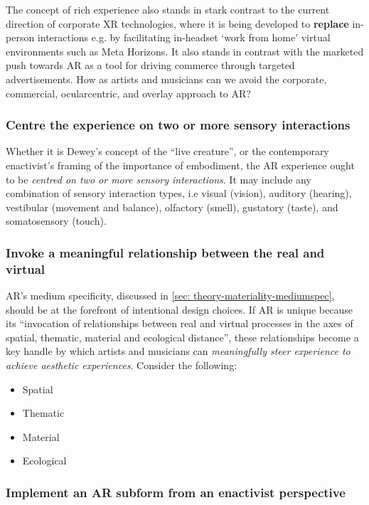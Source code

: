 The concept of rich experience also stands in stark contrast to the current direction of corporate XR technologies, where it is being developed to \textbf{replace} in-person interactions e.g. by facilitating in-headset `work from home' virtual environments such as Meta Horizons. It also stands in contrast with the marketed push towards AR as a tool for driving commerce through targeted advertisements. How as artists and musicians can we avoid the corporate, commercial, ocularcentric, and overlay approach to AR?

\subsubsection{Centre the experience on two or more sensory interactions}
Whether it is Dewey's concept of the ``live creature'', or the contemporary enactivist's framing of the importance of embodiment, the AR experience ought to be \textit{centred on two or more sensory interactions}. It may include any combination of sensory interaction types, i.e visual (vision), auditory (hearing), vestibular (movement and balance), olfactory (smell), gustatory (taste), and somatosensory (touch). %

\subsubsection{Invoke a meaningful relationship between the real and virtual}
AR's medium specificity, discussed in \autoref{sec: theory-materiality-mediumspec}, should be at the forefront of intentional design choices. If AR is unique because its ``invocation of relationships between real and virtual processes in the axes of spatial, thematic, material and ecological distance'', these relationships become a key handle by which artists and musicians can \textit{meaningfully steer experience to achieve aesthetic experiences}. Consider the following:
\begin{itemize}
    \item Spatial \\
    \item Thematic \\
    \item Material \\
    \item Ecological \\
\end{itemize}

\subsubsection{Implement an AR subform from an enactivist perspective}

